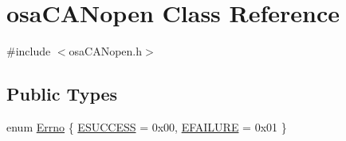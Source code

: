 \hypertarget{classosa_c_a_nopen}{\section{osa\-C\-A\-Nopen Class Reference}
\label{classosa_c_a_nopen}
}


{\ttfamily \#include $<$osa\-C\-A\-Nopen.\-h$>$}

\subsection*{Public Types}
\begin{DoxyCompactItemize}
\item 
enum \hyperlink{classosa_c_a_nopen_a5bf7839b2a382734c2f745e50ea7cfa0}{Errno} \{ \hyperlink{classosa_c_a_nopen_a5bf7839b2a382734c2f745e50ea7cfa0aa37f65c3e44df1d419cd94195bd39997}{E\-S\-U\-C\-C\-E\-S\-S} = 0x00, 
\hyperlink{classosa_c_a_nopen_a5bf7839b2a382734c2f745e50ea7cfa0a5627101253d1bf51ea8a3ae69dbd869e}{E\-F\-A\-I\-L\-U\-R\-E} = 0x01
 \}
\end{DoxyCompactItemize}
